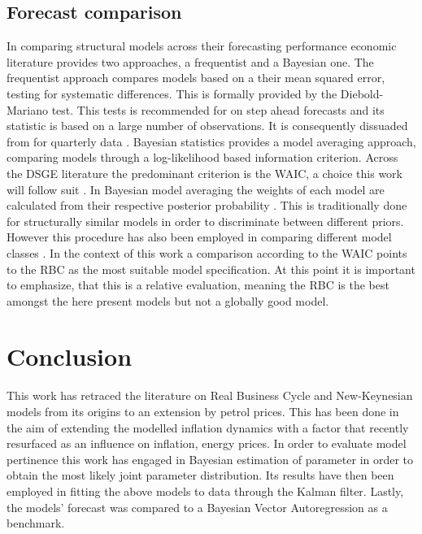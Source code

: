 \documentclass[12pt,a4paper,english]{article} %
\let\oldsection\section
\renewcommand\section{\clearpage\oldsection}
\begin{document}
	\subsection{Forecast comparison}
	In comparing structural models across their forecasting performance economic literature provides two approaches, a frequentist and a Bayesian one. The frequentist approach compares models based on a their mean squared error, testing for systematic differences. This is formally provided by the Diebold-Mariano test. This tests is recommended for on step ahead forecasts and its statistic is based on a large number of observations. It is consequently dissuaded from for quarterly data \cite{chin_bayesian_2019}. Bayesian statistics provides a model averaging approach, comparing models through a log-likelihood based information criterion. Across the DSGE literature the predominant criterion is the \ac{WAIC}, a choice this work will follow suit \cite{chin_bayesian_2019}. In Bayesian model averaging the weights of each model are calculated from their respective posterior probability \cite{chin_bayesian_2019}. This is traditionally done for structurally similar models in order to discriminate between different priors. However this procedure has also been employed in comparing different model classes \cite{chin_bayesian_2019}. In the context of this work a comparison according to the \ac{WAIC} points to the RBC as the most suitable model specification. At this point it is important to emphasize, that this is a relative evaluation, meaning the RBC is the best amongst the here present models but not a globally good model.
	
	\section{Conclusion}
	This work has retraced the literature on Real Business Cycle and New-Keynesian models from its origins to an extension by petrol prices. This has been done in the aim of extending the modelled inflation dynamics with a factor that recently resurfaced as an influence on inflation, energy prices.
	In order to evaluate model pertinence this work has engaged in Bayesian estimation of parameter in order to obtain the most likely joint parameter distribution. Its results have then been employed in fitting the above models to data through the Kalman filter. Lastly, the models' forecast was compared to a Bayesian Vector Autoregression as a benchmark.
	
\end{document}
